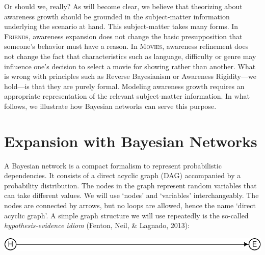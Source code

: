 \documentclass[
  11pt,
  dvipsnames,enabledeprecatedfontcommands, todos]{scrartcl}
\begin{document}
Or should we, really? As will become clear, we believe that theorizing
about awareness growth should be grounded in the subject-matter
information underlying the scenario at hand. This subject-matter takes
many forms. In \textsc{Friends}, awareness expansion does not change the
basic presupposition that someone's behavior must have a reason. In
\textsc{Movies}, awareness refinement does not change the fact that
characteristics such as language, difficulty or genre may influence
one's decision to select a movie for showing rather than another. What
is wrong with principles such as Reverse Bayesianism or Awareness
Rigidity---we hold---is that they are purely formal. Modeling awareness
growth requires an appropriate representation of the relevant
subject-matter information. In what follows, we illustrate how Bayesian
networks can serve this purpose.

\hypertarget{expansion-with-bayesian-networks}{%
\section{Expansion with Bayesian
Networks}\label{expansion-with-bayesian-networks}}

\label{sec:expansion-networks}

A Bayesian network is a compact formalism to represent probabilistic
dependencies. It consists of a direct acyclic graph (DAG) accompanied by
a probability distribution. The nodes in the graph represent random
variables that can take different values. We will use `nodes' and
`variables' interchangeably. The nodes are connected by arrows, but no
loops are allowed, hence the name `direct acyclic graph'. A simple graph
structure we will use repeatedly is the so-called
\emph{hypothesis-evidence idiom} (Fenton, Neil, \& Lagnado, 2013):

\begin{center}\includegraphics[width=0.5\linewidth,height=0.5\textheight]{ReplyToSteeleStefansson5_files/figure-latex/heDAG-prel-1} \end{center}
\end{document}
